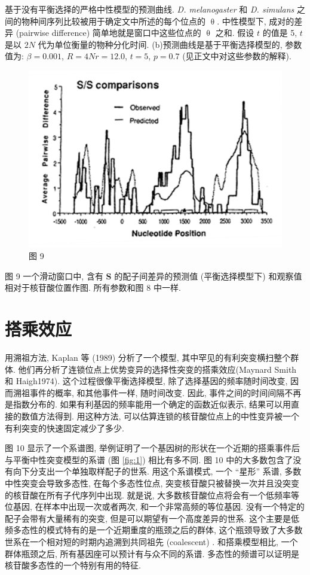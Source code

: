 \documentclass[
    12pt,%
    ]{article}
\begin{document}
基于没有平衡选择的严格中性模型的预测曲线. \textit{D. melanogaster} 和 \textit{D. simulans}
之间的物种间序列比较被用于确定文中所述的每个位点的 $\uptheta$. 中性模型下, 成对的差异 (pairwise difference)
简单地就是窗口中这些位点的 $\uptheta$ 之和. 假设 $t$ 的值是 5, $t$ 是以 $2N$ 代为单位衡量的物种分化时间.
(b)预测曲线是基于平衡选择模型的, 参数值为: $\beta = 0.001$, $R = 4Nr = 12.0$, $t=5$, $p=0.7$
(见正文中对这些参数的解释).

\begin{figure}
    \centering
    \includegraphics{coalescent-process.images/image9.png}
    \caption{图 9}
\end{figure}

图 9 一个滑动窗口中, 含有 \textbf{S} 的配子间差异的预测值 (平衡选择模型下) 和观察值相对于核苷酸位置作图. 所有参数和图
8 中一样.

\section{搭乘效应}

用溯祖方法, Kaplan 等 (1989) 分析了一个模型, 其中罕见的有利突变横扫整个群体.
他们再分析了连锁位点上优势变异的选择性突变的搭乘效应(Maynard Smith 和 Haigh1974). 这个过程很像平衡选择模型,
除了选择基因的频率随时间改变, 因而溯祖事件的概率, 和其他事件一样, 随时间改变. 因此, 事件之间的时间间隔不再是指数分布的.
如果有利基因的频率能用一个确定的函数近似表示, 结果可以用直接的数值方法得到. 用这种方法,
可以估算连锁的核苷酸位点上的中性变异被一个有利突变的快速固定减少了多少.

图 10 显示了一个系谱图, 举例证明了一个基因树的形状在一个近期的搭乘事件后与平衡中性突变模型的系谱 (图
\ref{fig:1}) 相比有多不同. 图 10 中的大多数包含了没有向下分支出一个单独取样配子的世系. 用这个系谱模式,
一个 ``星形'' 系谱, 多数中性突变会导致多态性, 在每个多态性位点,
突变核苷酸只被替换一次并且没突变的核苷酸在所有子代序列中出现. 就是说, 大多数核苷酸位点将会有一个低频率等位基因,
在样本中出现一次或者两次, 和一个非常高频的等位基因. 没有一个特定的配子会带有大量稀有的突变,
但是可以期望有一个高度差异的世系. 这个主要是低频多态性的模式特有的是一个近期重度的瓶颈之后的群体,
这个瓶颈导致了大多数世系在一个相对短的时期内追溯到共同祖先 (coalescent) . 和搭乘模型相比, 一个群体瓶颈之后,
所有基因座可以预计有与众不同的系谱. 多态性的频谱可以证明是核苷酸多态性的一个特别有用的特征.
\end{document}
